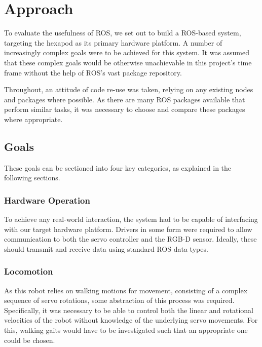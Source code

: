 \chapter{Approach}

To evaluate the usefulness of ROS, we set out to build a ROS-based system, targeting the hexapod as its primary hardware platform. A number of increasingly complex goals were to be achieved for this system. It was assumed that these complex goals would be otherwise unachievable in this project's time frame without the help of ROS's vast package repository.

Throughout, an attitude of code re-use was taken, relying on any existing nodes and packages where possible. As there are many ROS packages available that perform similar tasks, it was necessary to choose and compare these packages where appropriate. 


\section{Goals}

These goals can be sectioned into four key categories, as explained in the following sections.

\subsection{Hardware Operation}

To achieve any real-world interaction, the system had to be capable of interfacing with our target hardware platform. Drivers in some form were required to allow communication to both the servo controller and the RGB-D sensor. Ideally, these should transmit and receive data using standard ROS data types.

\subsection{Locomotion}

As this robot relies on walking motions for movement, consisting of a complex sequence of servo rotations, some abstraction of this process was required. Specifically, it was necessary to be able to control both the linear and rotational velocities of the robot without knowledge of the underlying servo movements. For this, walking gaits would have to be investigated such that an appropriate one could be chosen.

